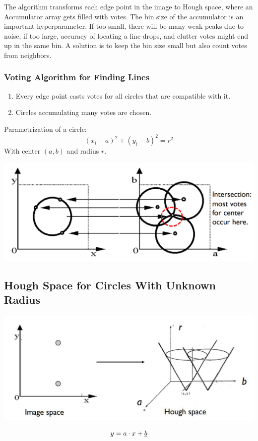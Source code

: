 The algorithm transforms each edge point in the image to Hough space, where an Accumulator array gets filled with votes.
The bin size of the accumulator is an important hyperparameter. If too small, there will be many weak peaks due to noise;
if too large, accuracy of locating a line drops, and clutter votes might end up in the same bin.
A solution is to keep the bin size small but also count votes from neighbors.

\subsubsection{Voting Algorithm for Finding Lines}

\begin{enumerate}
	\item Every edge point casts votes for all circles that are compatible with it.
	\item Circles accumulating many votes are chosen.
\end{enumerate}

\begin{theorem}
	Parametrization of a circle:
	\begin{equation*}
		(x_i - a)^2 + (y_i - b)^2 = r^2
	\end{equation*}
	With center $(a,b)$ and radius $r$.
\end{theorem}

\begin{center}
	\includegraphics[width=0.7\linewidth]{img/hough_circle_accumulator}
\end{center}

\subsection{Hough Space for Circles With Unknown Radius}

\begin{center}
	\includegraphics[width=0.7\linewidth]{img/hough_circle_accumulator_point}
\end{center}

\begin{equation*}
	y = a\cdot x + \sout{b}
\end{equation*}
